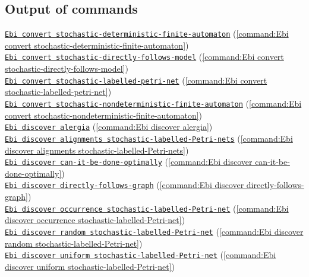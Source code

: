 {\subsection*{Output of commands} \null\qquad\hyperref[command:Ebi convert stochastic-deterministic-finite-automaton]{\texttt{Ebi convert stochastic-deterministic-finite-automaton}} (\cref{command:Ebi convert stochastic-deterministic-finite-automaton})\\\null\qquad\hyperref[command:Ebi convert stochastic-directly-follows-model]{\texttt{Ebi convert stochastic-directly-follows-model}} (\cref{command:Ebi convert stochastic-directly-follows-model})\\\null\qquad\hyperref[command:Ebi convert stochastic-labelled-petri-net]{\texttt{Ebi convert stochastic-labelled-petri-net}} (\cref{command:Ebi convert stochastic-labelled-petri-net})\\\null\qquad\hyperref[command:Ebi convert stochastic-nondeterministic-finite-automaton]{\texttt{Ebi convert stochastic-nondeterministic-finite-automaton}} (\cref{command:Ebi convert stochastic-nondeterministic-finite-automaton})\\\null\qquad\hyperref[command:Ebi discover alergia]{\texttt{Ebi discover alergia}} (\cref{command:Ebi discover alergia})\\\null\qquad\hyperref[command:Ebi discover alignments stochastic-labelled-Petri-nets]{\texttt{Ebi discover alignments stochastic-labelled-Petri-nets}} (\cref{command:Ebi discover alignments stochastic-labelled-Petri-nets})\\\null\qquad\hyperref[command:Ebi discover can-it-be-done-optimally]{\texttt{Ebi discover can-it-be-done-optimally}} (\cref{command:Ebi discover can-it-be-done-optimally})\\\null\qquad\hyperref[command:Ebi discover directly-follows-graph]{\texttt{Ebi discover directly-follows-graph}} (\cref{command:Ebi discover directly-follows-graph})\\\null\qquad\hyperref[command:Ebi discover occurrence stochastic-labelled-Petri-net]{\texttt{Ebi discover occurrence stochastic-labelled-Petri-net}} (\cref{command:Ebi discover occurrence stochastic-labelled-Petri-net})\\\null\qquad\hyperref[command:Ebi discover random stochastic-labelled-Petri-net]{\texttt{Ebi discover random stochastic-labelled-Petri-net}} (\cref{command:Ebi discover random stochastic-labelled-Petri-net})\\\null\qquad\hyperref[command:Ebi discover uniform stochastic-labelled-Petri-net]{\texttt{Ebi discover uniform stochastic-labelled-Petri-net}} (\cref{command:Ebi discover uniform stochastic-labelled-Petri-net})
}
